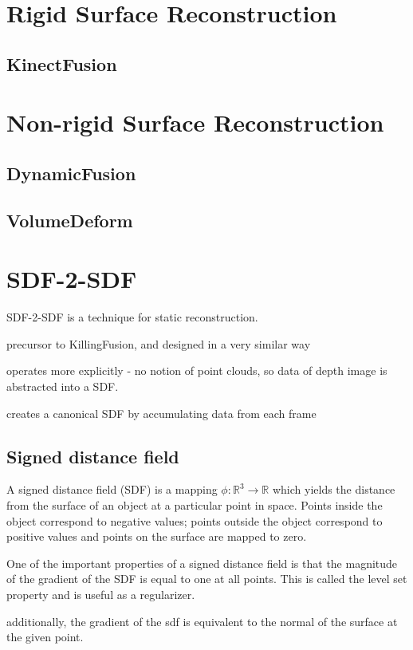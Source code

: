 \documentclass[12pt,twoside]{report}
\begin{document}
\section{Rigid Surface Reconstruction}
\subsection{KinectFusion}
\section{Non-rigid Surface Reconstruction}
\subsection{DynamicFusion}

\subsection{VolumeDeform}

\section{SDF-2-SDF}

SDF-2-SDF is a technique for static reconstruction.

precursor to KillingFusion, and designed in a very similar way

operates more explicitly - no notion of point clouds, so data of depth image is abstracted into a SDF. 

creates a canonical SDF by accumulating data from each frame

\subsection{Signed distance field}

A signed distance field (SDF) is a mapping $\phi : \mathbb{R}^3 \rightarrow  \mathbb{R}$ which yields the distance from the surface of an object at a particular point in space. 
Points inside the object correspond to negative values; points outside the object correspond to positive values and points on the surface are mapped to zero.

One of the important properties of a signed distance field is that the magnitude of the gradient of the SDF is equal to one at all points. This is called the level set property and is useful as a regularizer.

additionally, the gradient of the sdf is equivalent to the normal of the surface at the given point.
\end{document}
